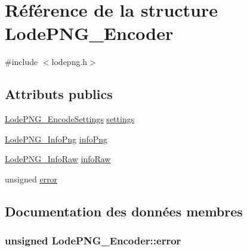 \hypertarget{struct_lode_p_n_g___encoder}{}\section{Référence de la structure Lode\+P\+N\+G\+\_\+\+Encoder}
\label{struct_lode_p_n_g___encoder}


{\ttfamily \#include $<$lodepng.\+h$>$}

\subsection*{Attributs publics}
\begin{DoxyCompactItemize}
\item 
\hyperlink{struct_lode_p_n_g___encode_settings}{Lode\+P\+N\+G\+\_\+\+Encode\+Settings} \hyperlink{struct_lode_p_n_g___encoder_ae36ceb21b9d1007491f4edbb2be12bab}{settings}
\item 
\hyperlink{struct_lode_p_n_g___info_png}{Lode\+P\+N\+G\+\_\+\+Info\+Png} \hyperlink{struct_lode_p_n_g___encoder_a5c4bc6d9be898fbcc14b5d762d69457e}{info\+Png}
\item 
\hyperlink{struct_lode_p_n_g___info_raw}{Lode\+P\+N\+G\+\_\+\+Info\+Raw} \hyperlink{struct_lode_p_n_g___encoder_af37ca9b0bcecd5d1d68756fd293ab998}{info\+Raw}
\item 
unsigned \hyperlink{struct_lode_p_n_g___encoder_a18e658a08db22dd34fc26c138f3eb2df}{error}
\end{DoxyCompactItemize}


\subsection{Documentation des données membres}
\hypertarget{struct_lode_p_n_g___encoder_a18e658a08db22dd34fc26c138f3eb2df}{}
\subsubsection[{error}]{\setlength{\rightskip}{0pt plus 5cm}unsigned Lode\+P\+N\+G\+\_\+\+Encoder\+::error}\label{struct_lode_p_n_g___encoder_a18e658a08db22dd34fc26c138f3eb2df}
\hypertarget{struct_lode_p_n_g___encoder_a5c4bc6d9be898fbcc14b5d762d69457e}{}

